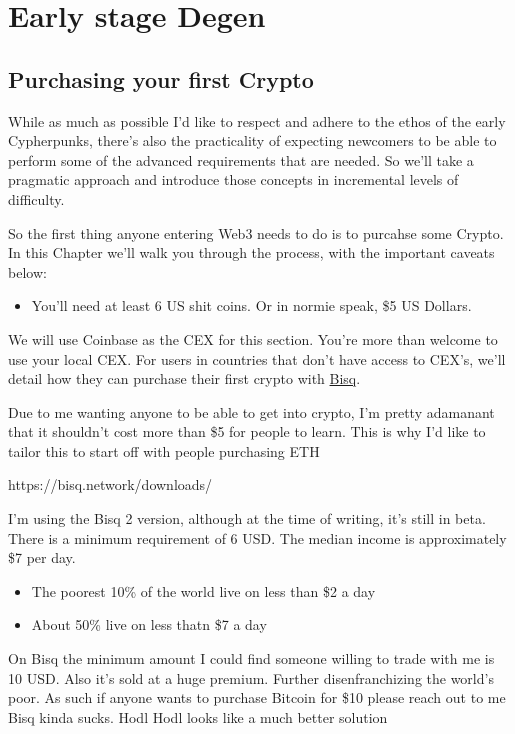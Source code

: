 \documentclass[
  letterpaper,
  DIV=11,
  numbers=noendperiod]{scrreprt}
\providecommand{\tightlist}{%
  \setlength{\itemsep}{0pt}\setlength{\parskip}{0pt}}\usepackage{longtable,booktabs,array}
\begin{document}
\chapter{Early stage Degen}\label{early-stage-degen}

\section{Purchasing your first
Crypto}\label{purchasing-your-first-crypto}

While as much as possible I'd like to respect and adhere to the ethos of
the early Cypherpunks, there's also the practicality of expecting
newcomers to be able to perform some of the advanced requirements that
are needed. So we'll take a pragmatic approach and introduce those
concepts in incremental levels of difficulty.

So the first thing anyone entering Web3 needs to do is to purcahse some
Crypto. In this Chapter we'll walk you through the process, with the
important caveats below:

\begin{itemize}
\tightlist
\item
  You'll need at least 6 US shit coins. Or in normie speak, \$5 US
  Dollars.
\end{itemize}

We will use Coinbase as the CEX for this section. You're more than
welcome to use your local CEX. For users in countries that don't have
access to CEX's, we'll detail how they can purchase their first crypto
with \href{https://bisq.network}{Bisq}.

Due to me wanting anyone to be able to get into crypto, I'm pretty
adamanant that it shouldn't cost more than \$5 for people to learn. This
is why I'd like to tailor this to start off with people purchasing ETH

https://bisq.network/downloads/

I'm using the Bisq 2 version, although at the time of writing, it's
still in beta. There is a minimum requirement of 6 USD. The median
income is approximately \$7 per day.

\begin{itemize}
\tightlist
\item
  The poorest 10\% of the world live on less than \$2 a day
\item
  About 50\% live on less thatn \$7 a day
\end{itemize}

On Bisq the minimum amount I could find someone willing to trade with me
is 10 USD. Also it's sold at a huge premium. Further disenfranchizing
the world's poor. As such if anyone wants to purchase Bitcoin for \$10
please reach out to me Bisq kinda sucks. Hodl Hodl looks like a much
better solution
\end{document}
